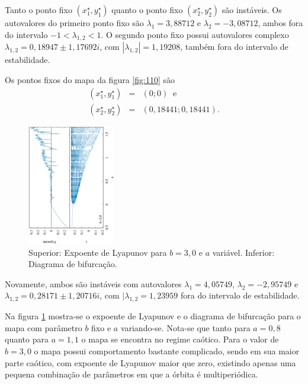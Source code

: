 \documentclass[brazilian, 12pt, a4paper, final]{article}
\begin{document}
\begin{multicols*}{2}
Tanto o ponto fixo $(x^{\star}_1,y^{\star}_1)$ quanto o ponto fixo $(x^{\star}_2,y^{\star}_2)$ são instáveis. Os autovalores do primeiro ponto fixo são $\lambda_1=3,88712$ e $\lambda_2=-3,08712$, ambos fora do intervalo $-1<\lambda_{1,2}<1$. O segundo ponto fixo possui autovalores complexo $\lambda_{1,2}=0,18947\pm1,17692i$, com $|\lambda_{1,2}|=1,19208$, também fora do intervalo de estabilidade.

Os pontos fixos do mapa da figura \ref{fig:110} são
\begin{eqnarray}
	\nonumber (x^{\star}_1,y^{\star}_1)&=&(0; 0) \;\; \mathrm{e} \\
	\nonumber (x^{\star}_2,y^{\star}_2)&=&(0,18441; 0,18441).
\end{eqnarray}

\begin{figure}[H] 
  \centering
  \includegraphics[width=0.34\textwidth,angle=-90]{lyapunov_a05_b30.eps}
  \caption{Superior: Expoente de Lyapunov para $b=3,0$ e $a$ variável. Inferior: Diagrama de bifurcação.}
  \label{fig:30}
\end{figure}

Novamente, ambos são instáveis com autovalores  $\lambda_1=4,05749$, $\lambda_2=-2,95749$ e $\lambda_{1,2}=0,28171\pm1,20716i$, com $|\lambda_{1,2}=1,23959$ fora do intervalo de estabilidade.

Na figura \ref{fig:30} mostra-se o expoente de Lyapunov e o diagrama de bifurcação para o mapa com parâmetro $b$ fixo e $a$ variando-se. Nota-se que tanto para $a=0,8$ quanto para $a=1,1$ o mapa se encontra no regime caótico. Para o valor de $b=3,0$ o mapa possui comportamento bastante complicado, sendo em sua maior parte caótico, com expoente de Lyapunov maior que zero, existindo apenas uma pequena combinação de parâmetros em que a órbita é multiperiódica.


\end{multicols*}
\end{document}
